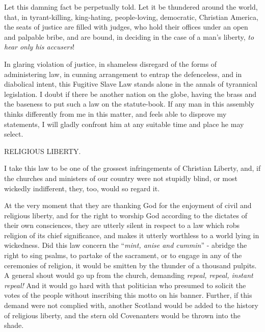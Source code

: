 Let this damning fact be perpetually told. Let it be thundered around the world, that, in tyrant-killing, king-hating, people-loving, democratic, Christian America, the seats of justice are filled with judges, who hold their offices under an open and palpable bribe, and are bound, in deciding in the case of a man’s liberty, \textit{to hear only his accusers}!\par

In glaring violation of justice, in shameless disregard of the forms of administering law, in cunning arrangement to entrap the defenceless, and in diabolical intent, this Fugitive Slave Law stands alone in the annals of tyrannical legislation. I doubt if there be another nation on the globe, having the brass and the baseness to put such a law on the statute-book. If any man in this assembly thinks differently from me in this matter, and feels able to disprove my statements, I will gladly confront him at any suitable time and place he may select.\par

RELIGIOUS LIBERTY.\par

I take this law to be one of the grossest infringements of Christian Liberty, and, if the churches and ministers of our country were not stupidly blind, or most wickedly indifferent, they, too, would so regard it.\par

At the very moment that they are thanking God for the enjoyment of civil and religious liberty, and for the right to worship God according to the dictates of their own consciences, they are utterly silent in respect to a law which robs religion of its chief significance, and makes it utterly worthless to a world lying in wickedness. Did this law concern the “\textit{mint, anise and cummin}” - abridge the right to sing psalms, to partake of the sacrament, or to engage in any of the ceremonies of religion, it would be smitten by the thunder of a thousand pulpits. A general shout would go up from the church, demanding \textit{repeal, repeal, instant repeal!} And it would go hard with that politician who presumed to solicit the votes of the people without inscribing this motto on his banner. Further, if this demand were not complied with, another Scotland would be added to the history of religious liberty, and the stern old Covenanters would be thrown into the shade.\par

